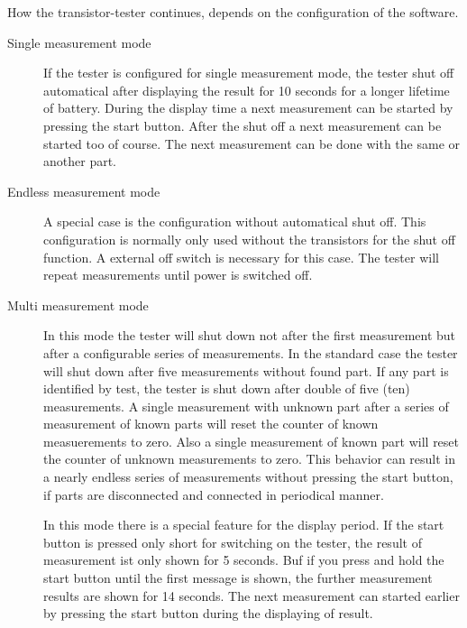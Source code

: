 How the transistor-tester continues, depends on the configuration of the software.
\begin{description}
  \item[Single measurement mode] If the tester is configured for single measurement mode, the tester shut off automatical after displaying the
result for 10 seconds for a longer lifetime of battery. 
During the display time a next measurement can be started by pressing the start button.
After the shut off a next measurement can be started too of course.
The next measurement can be done with the same or another part.\\

  \item[Endless measurement mode] A special case is the configuration without automatical shut off.
This configuration is normally only used without the transistors for the shut off function.
A external off switch is necessary for this case. The tester will repeat measurements until power
is switched off.\\

  \item[Multi measurement mode] In this mode the tester will shut down not after the first measurement but 
after a configurable series of measurements. In the standard case the tester will shut down after five
measurements without found part. If any part is identified by test, the tester is shut down after double of
five (ten) measurements. A single measurement with unknown part after a series of measurement of known parts will
reset the counter of known measuerements to zero. Also a single measurement of known part will reset the counter
of unknown measurements to zero. This behavior can result in a nearly endless series of measurements without
pressing the start button, if parts are disconnected and connected in periodical manner.

In this mode there is a special feature for the display period. If the start button is pressed only short for switching
on the tester, the result of measurement ist only shown for 5 seconds. Buf if you press and hold the start button until
the first message is shown, the further measurement results are shown for 14 seconds.
The next measurement can started earlier by pressing the start button during the displaying of result.\\

\end{description}

